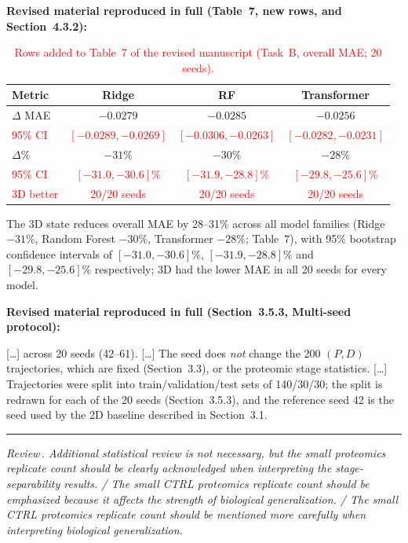 \documentclass[11pt]{article}
\newcounter{reviewer}
\newcounter{point}[reviewer]
\renewcommand{\thepoint}{Review\,\thereviewer.\arabic{point}}
\newcommand{\point}[1]{\refstepcounter{point}  \bigskip \hrule \medskip \noindent \textit{{\fontseries{b}\selectfont \thepoint } #1}\par}
\newcommand{\revisedheading}[1]{\medskip\noindent\textbf{Revised material
  reproduced in full (#1):}\par}
\newenvironment{revised}{\par\color{red}}{\par}
\begin{document}
\revisedheading{Table~7, new rows, and Section~4.3.2}
\begin{table}[!htbp]
\centering
\caption{\textcolor{red}{Rows added to Table~7 of the revised manuscript (Task~B, overall MAE; 20 seeds).}}
\begin{tabular}{lccc}
\toprule
Metric & Ridge & RF & Transformer \\
\midrule
$\Delta$ MAE & $-0.0279$ & $-0.0285$ & $-0.0256$ \\
\textcolor{red}{95\% CI} & \textcolor{red}{$[-0.0289, -0.0269]$} & \textcolor{red}{$[-0.0306, -0.0263]$} & \textcolor{red}{$[-0.0282, -0.0231]$} \\
$\Delta$\% & $-31\%$ & $-30\%$ & $-28\%$ \\
\textcolor{red}{95\% CI} & \textcolor{red}{$[-31.0, -30.6]\%$} & \textcolor{red}{$[-31.9, -28.8]\%$} & \textcolor{red}{$[-29.8, -25.6]\%$} \\
\textcolor{red}{3D better} & \textcolor{red}{20/20 seeds} & \textcolor{red}{20/20 seeds} & \textcolor{red}{20/20 seeds} \\
\bottomrule
\end{tabular}
\end{table}
\begin{revised}
The 3D state reduces overall MAE by 28--31\% across all model families (Ridge $-31\%$, Random Forest $-30\%$, Transformer $-28\%$; Table~7), with 95\% bootstrap confidence intervals of $[-31.0, -30.6]\%$, $[-31.9, -28.8]\%$ and $[-29.8, -25.6]\%$ respectively; 3D had the lower MAE in all 20 seeds for every model.
\end{revised}

\revisedheading{Section~3.5.3, Multi-seed protocol}
\begin{revised}
[\ldots] across 20 seeds (42--61). [\ldots] The seed does \textit{not} change the 200 $(P, D)$ trajectories, which are fixed (Section~3.3), or the proteomic stage statistics. [\ldots] Trajectories were split into train/validation/test sets of 140/30/30; the split is redrawn for each of the 20 seeds (Section~3.5.3), and the reference seed 42 is the seed used by the 2D baseline described in Section~3.1.
\end{revised}

\point{ Additional statistical review is not necessary, but the small proteomics replicate count should be clearly acknowledged when interpreting the stage-separability results. / The small CTRL proteomics replicate count should be emphasized because it affects the strength of biological generalization. / The small CTRL proteomics replicate count should be mentioned more carefully when interpreting biological generalization.}
\end{document}
